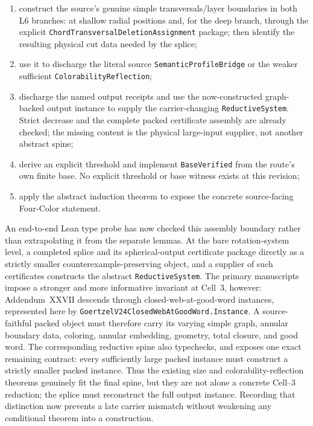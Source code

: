 \documentclass[11pt]{article}
\theoremstyle{definition}
\begin{document}
\begin{enumerate}
  \item construct the source's genuine simple transversals/layer boundaries
        in both L6 branches: at shallow radial positions and, for the deep
        branch, through the explicit
        \texttt{ChordTransversalDeletionAssignment} package; then identify
        the resulting physical cut data needed by the splice;
  \item use it to discharge the literal source
        \texttt{SemanticProfileBridge} or the weaker sufficient
        \texttt{ColorabilityReflection};
  \item discharge the named output receipts and use the now-constructed
        graph-backed output instance to supply the carrier-changing
        \texttt{ReductiveSystem}.  Strict decrease and the complete packed
        certificate assembly are already checked; the missing content is the
        physical large-input supplier, not another abstract spine;
  \item derive an explicit threshold and implement \texttt{BaseVerified} from
        the route's own finite base.  No explicit threshold or base witness
        exists at this revision;
  \item apply the abstract induction theorem to expose the concrete
        source-facing Four-Color statement.
\end{enumerate}

An end-to-end Lean type probe has now checked this assembly boundary rather
than extrapolating it from the separate lemmas.  At the bare rotation-system
level, a completed splice and its spherical-output certificate package
directly as a strictly smaller counterexample-preserving object, and a
supplier of such certificates constructs the abstract
\texttt{ReductiveSystem}.  The primary manuscripts impose a stronger and
more informative invariant at Cell~3, however: Addendum~XXVII descends through
closed-web-at-good-word instances, represented here by
\texttt{GoertzelV24ClosedWebAtGoodWord.Instance}.  A source-faithful packed
object must therefore carry its varying simple graph, annular boundary data,
coloring, annular embedding, geometry, total closure, and good word.  The
corresponding reductive spine also typechecks, and exposes one exact remaining
contract: every sufficiently large packed instance must construct a strictly
smaller packed instance.  Thus the existing size and colorability-reflection
theorems genuinely fit the final spine, but they are not alone a concrete
Cell--3 reduction; the splice must reconstruct the full output instance.
Recording that distinction now prevents a late carrier mismatch without
weakening any conditional theorem into a construction.
\end{document}

